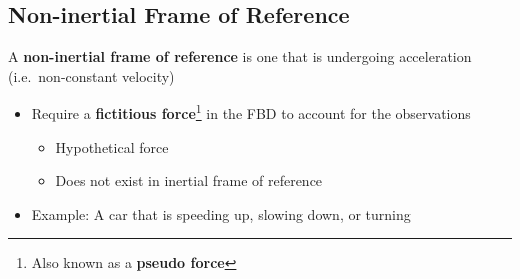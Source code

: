 \subsection{Non-inertial Frame of Reference}
A \textbf{non-inertial frame of reference} is one that is undergoing
acceleration (i.e.\ non-constant velocity)
\begin{itemize}
\item Require a \textbf{fictitious force}\footnote{Also known as a
\textbf{pseudo force}} in the FBD to account for the observations
  \begin{itemize}
  \item Hypothetical force
  \item Does not exist in inertial frame of reference
  \end{itemize}
\item Example: A car that is speeding up, slowing down, or turning
\end{itemize}
\begin{center}
\end{center}




